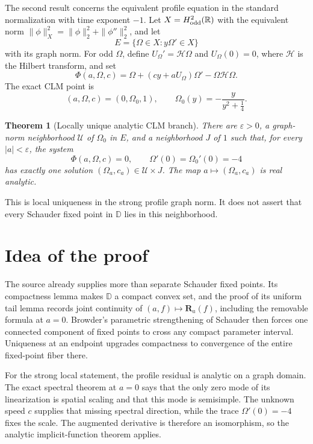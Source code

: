 \documentclass[11pt]{article}
\newtheorem{theorem}{Theorem}
\newcommand{\R}{\mathbb R}
\newcommand{\D}{\mathbb D}
\newcommand{\cH}{\mathcal H}
\newcommand{\cR}{\mathbf R}
\begin{document}
The second result concerns the equivalent profile equation in the standard
normalization with time exponent $-1$.  Let $X=H^2_{\rm odd}(\R)$ with the
equivalent norm $\|\phi\|_X^2=\|\phi\|_2^2+\|\phi''\|_2^2$, and let
\[
 E=\{\Omega\in X:y\Omega'\in X\}
\]
with its graph norm.  For odd $\Omega$, define
$U_\Omega'=\cH\Omega$ and $U_\Omega(0)=0$, where $\cH$ is the Hilbert
transform, and set
\[
 \Phi(a,\Omega,c)=
 \Omega+(cy+aU_\Omega)\Omega'-\Omega\cH\Omega.
\]
The exact CLM point is
\[
 (a,\Omega,c)=(0,\Omega_0,1),\qquad
 \Omega_0(y)=-\frac{y}{y^2+\tfrac14}.
\]

\begin{theorem}[Locally unique analytic CLM branch]
\label{thm:ift}
There are $\varepsilon>0$, a graph-norm neighborhood $\mathcal U$ of
$\Omega_0$ in $E$, and a neighborhood $J$ of $1$ such that, for every
$|a|<\varepsilon$, the system
\[
 \Phi(a,\Omega,c)=0,
 \qquad \Omega'(0)=\Omega_0'(0)=-4
\]
has exactly one solution $(\Omega_a,c_a)\in\mathcal U\times J$.  The map
$a\mapsto(\Omega_a,c_a)$ is real analytic.
\end{theorem}

This is local uniqueness in the strong profile graph norm.  It does not
assert that every Schauder fixed point in $\D$ lies in this neighborhood.

\section{Idea of the proof}

The source already supplies more than separate Schauder fixed points.  Its
compactness lemma makes $\D$ a compact convex set, and the proof of its
uniform tail lemma records joint continuity of $(a,f)\mapsto\cR_a(f)$,
including the removable formula at $a=0$.  Browder's parametric strengthening
of Schauder then forces one connected component of fixed points to cross any
compact parameter interval.  Uniqueness at an endpoint upgrades compactness
to convergence of the entire fixed-point fiber there.

For the strong local statement, the profile residual is analytic on a graph
domain.  The exact spectral theorem at $a=0$ says that the only zero mode of
its linearization is spatial scaling and that this mode is semisimple.  The
unknown speed $c$ supplies that missing spectral direction, while the trace
$\Omega'(0)=-4$ fixes the scale.  The augmented derivative is therefore an
isomorphism, so the analytic implicit-function theorem applies.
\end{document}
